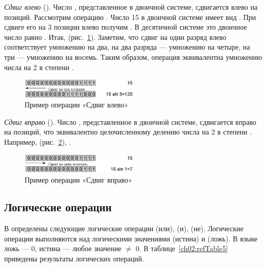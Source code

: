 \emph{Сдвиг влево} (). Число
, представленное в двоичной системе, сдвигается
влево на  позиций. Рассмотрим операцию . Число 15 в двоичной системе
имеет вид . При сдвиге его на 3 позиции влево получим . В десятичной 
системе это двоичное число равно .
Итак,  (рис.~\ref{ch02:refDrawing4}). Заметим, что сдвиг на один разряд влево соответствует
умножению на два, на два разряда --- умножению на четыре, на три --- умножению на восемь. Таким образом, операция
 эквивалентна умножению числа  на 2 в степени . 

\begin{figure}[htb]
\begin{center}
\includegraphics[width=0.5\textwidth]{img/ris_2_5}
\caption{Пример операции «Сдвиг влево»}
\label{ch02:refDrawing4}
\end{center}
\end{figure}

\emph{Сдвиг вправо} (). Число
, представленное в двоичной системе, сдвигается вправо на 
 позиций, что эквивалентно целочисленному делению числа
 на 2 в степени . Например,  (рис.~\ref{ch02:refDrawing5}), . 

\begin{figure}[htb]
\begin{center}
\includegraphics[width=0.5\textwidth]{img/ris_2_6}
\caption{Пример операции «Сдвиг вправо»}
\label{ch02:refDrawing5}
\end{center}
\end{figure}

\subsection[Логические операции]{Логические операции}
В  определены следующие логические
операции {\textbar}{\textbar} (или), \Sys{\&\&} (и), \Sys{!} (не). Логические операции выполняются над логическими
значениями  (истина) и  (ложь). В языке  ложь --- 0, истина --- любое
значение ${\neq}$ 0. В таблице~\ref{ch02:refTable5} приведены результаты логических операций.

